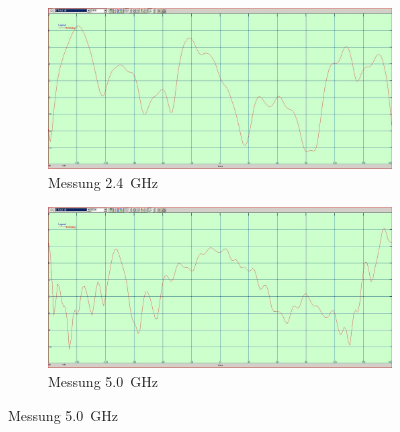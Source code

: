 \begin{figure}[h!]
	\begin{subfigure}[t]{0.49\textwidth}
		\includegraphics[width=1\textwidth]{../fig/plt/2G4_90phi_etot_dB.JPG}
		\caption{Messung \SI{2.4}{\giga\hertz}}
	\end{subfigure}
	\begin{subfigure}[t]{0.49\textwidth}
		\includegraphics[width=1\textwidth]{../fig/plt/5G0_90phi_etot_dB.JPG}
		\caption{Messung \SI{5.0}{\giga\hertz}}
	\end{subfigure}
\end{figure}


